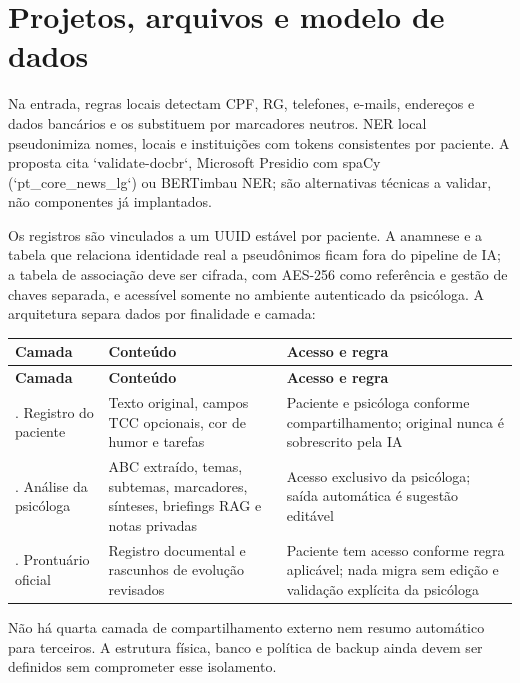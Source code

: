 \documentclass[11pt,a4paper]{article}
\begin{document}
\section{Projetos, arquivos e modelo de dados}
Na entrada, regras locais detectam CPF, RG, telefones, e-mails, endereços e dados bancários e os substituem por marcadores neutros. NER local pseudonimiza nomes, locais e instituições com tokens consistentes por paciente. A proposta cita `validate-docbr`, Microsoft Presidio com spaCy (`pt\_core\_news\_lg`) ou BERTimbau NER; são alternativas técnicas a validar, não componentes já implantados.

Os registros são vinculados a um UUID estável por paciente. A anamnese e a tabela que relaciona identidade real a pseudônimos ficam fora do pipeline de IA; a tabela de associação deve ser cifrada, com AES-256 como referência e gestão de chaves separada, e acessível somente no ambiente autenticado da psicóloga. A arquitetura separa dados por finalidade e camada:

\begingroup\small
\begin{longtable}{>{\raggedright\arraybackslash}p{}>{\raggedright\arraybackslash}p{}>{\raggedright\arraybackslash}p{}}
\toprule
\textbf{Camada} & \textbf{Conteúdo} & \textbf{Acesso e regra} \\ \midrule\endfirsthead
\toprule
\textbf{Camada} & \textbf{Conteúdo} & \textbf{Acesso e regra} \\ \midrule\endhead
\bottomrule\endfoot
1. Registro do paciente & Texto original, campos TCC opcionais, cor de humor e tarefas & Paciente e psicóloga conforme compartilhamento; original nunca é sobrescrito pela IA \\[3pt]
2. Análise da psicóloga & ABC extraído, temas, subtemas, marcadores, sínteses, briefings RAG e notas privadas & Acesso exclusivo da psicóloga; saída automática é sugestão editável \\[3pt]
3. Prontuário oficial & Registro documental e rascunhos de evolução revisados & Paciente tem acesso conforme regra aplicável; nada migra sem edição e validação explícita da psicóloga \\[3pt]
\end{longtable}
\endgroup
Não há quarta camada de compartilhamento externo nem resumo automático para terceiros. A estrutura física, banco e política de backup ainda devem ser definidos sem comprometer esse isolamento.
\end{document}
